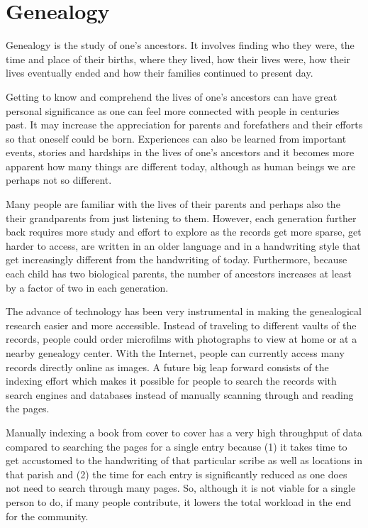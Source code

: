 
\section{Genealogy}

Genealogy is the study of one's ancestors. It involves finding who they were, the time and place of their births, where they lived, how their lives were, how their lives eventually ended and how their families continued to present day.

Getting to know and comprehend the lives of one's ancestors can have great personal significance as one can feel more connected with people in centuries past. It may increase the appreciation for parents and forefathers and their efforts so that oneself could be born.
Experiences can also be learned from important events, stories and hardships in the lives of one's ancestors and
it becomes more apparent
how many things are different today, although as human beings we are perhaps not so different.

Many people are familiar with the lives of their parents and perhaps also the their grandparents from just listening to them.
However, each generation further back requires more study and effort to explore as the records get more sparse, get harder to access, are written in an older language and in a handwriting style that get increasingly different from the handwriting of today. Furthermore, because each child has two biological parents, the number of ancestors increases at least by a factor of two in each generation.

The advance of technology has been very instrumental in making the genealogical research easier and more accessible. Instead of traveling to different vaults of the records, people could order microfilms with photographs to view at home or at a nearby genealogy center. With the Internet, people can currently access many records directly online as images. A future big leap forward consists of the indexing effort which makes it possible for people to search the records with search engines and databases instead of manually scanning through and reading the pages.

Manually indexing a book from cover to cover has a very high throughput of data compared to searching the pages for a single entry because (1) it takes time to get accustomed to the handwriting of that particular scribe as well as locations in that parish and (2) the time for each entry is significantly reduced as one does not need to search through many pages. So, although it is not viable for a single person to do, if many people contribute, it lowers the total workload in the end for the community.


